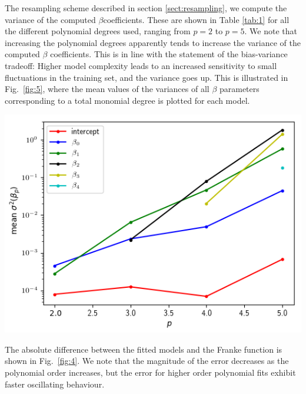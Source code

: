 \documentclass[a4paper]{article}
\newcommand{\fig}[1]{Fig.\ \ref{fig:#1}}
\newcommand{\tab}[1]{Table \ref{tab:#1}}
\newenvironment{Figure}
  {\par\medskip\noindent\minipage{\linewidth}}
  {\endminipage\par\medskip}
\begin{document}
\begin{multicols}{2}
The resampling scheme described in section \ref{sect:resampling}, we compute the variance of the computed $\beta$coefficients. These are shown in \tab{1} for all the different polynomial degrees used, ranging from $p=2$ to $p=5$. We note that increasing the polynomial degrees apparently tends to increase the variance of the computed $\beta$ coefficients. This is in line with the statement of the bias-variance tradeoff: Higher model complexity leads to an increased sensitivity to small fluctuations in the training set, and the variance goes up. This is illustrated in \fig{5}, where the mean values of the variances of all $\beta$ parameters corresponding to a total monomial degree is plotted for each model. 

\begin{Figure}
\centering
\includegraphics[width=\linewidth]{beta_variance_OLS.png}
\end{Figure}

The absolute difference between the fitted models and the Franke function is shown in \fig{4}. We note that the magnitude of the error decreases as the polynomial order increases, but the error for higher order polynomial fits exhibit faster oscillating behaviour. 


\end{multicols}
\end{document}
